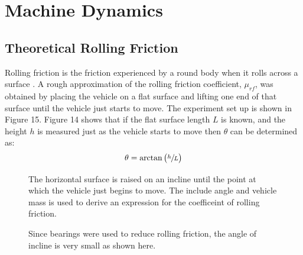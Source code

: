 \documentclass[a4paper]{article}
\begin{document}
\clearpage

\section{Machine Dynamics}
\subsection{Theoretical Rolling Friction}

Rolling friction is the friction experienced by a round body when it rolls across a surface \cite{Giancoli:2000}. A rough approximation of the rolling friction coefficient, $\mu_{rf}$, was obtained by placing the vehicle on a flat surface and lifting one end of that surface until the vehicle just starts to move. The experiment set up is shown in Figure 15. Figure 14 shows that if the flat surface length $L$ is known, and the height $h$ is measured just as the vehicle starts to move then $\theta$ can be determined as:
\begin{equation}
	\theta = \arctan \big( \sfrac{h}{L} \big)
\end{equation}
\begin{figure}[h]
	\centering
	\begin{minipage}{0.45\textwidth}
		\centering
		\caption{The horizontal surface is raised on an incline until the point at which the vehicle just begins to move. The include angle and vehicle mass is used to derive an expression for the coefficeint of rolling friction.}
	\end{minipage}
	\hspace{1cm}
	\begin{minipage}{0.45\textwidth}
		\centering
		\caption{Since bearings were used to reduce rolling friction, the angle of incline is very small as shown here.}
	\end{minipage}
\end{figure}
\end{document}
